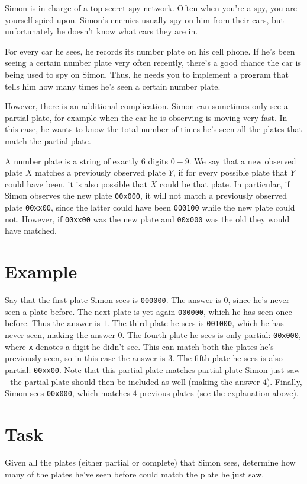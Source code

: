 \newcommand\version{v1}
Simon is in charge of a top secret spy network.
Often when you're a spy, you are yourself spied upon.
Simon's enemies usually spy on him from their cars, but unfortunately he doesn't know what cars they are in.

For every car he sees, he records its number plate on his cell phone.
If he's been seeing a certain number plate very often recently, there's a good chance the car is being used to spy on Simon.
Thus, he needs you to implement a program that tells him how many times he's seen a certain number plate.

However, there is an additional complication.
Simon can sometimes only see a partial plate, for example when the car he is observing is moving very fast.
In this case, he wants to know the total number of times he's seen all the plates that match the partial plate.

A number plate is a string of exactly 6 digits $0-9$. We say that a new observed plate $X$
matches a previously observed plate $Y$, if for every possible plate that $Y$ could have been, it is also
possible that $X$ could be that plate. In particular, if Simon observes the new plate \texttt{00x000}, it
will not match a previously observed plate \texttt{00xx00}, since the latter could have been \texttt{000100}
while the new plate could not. However, if \texttt{00xx00} was the new plate and \texttt{00x000} was the old
they would have matched.

\section*{Example}
Say that the first plate Simon sees is \texttt{000000}. The answer is $0$, since he's never seen a plate before.
The next plate is yet again \texttt{000000}, which he has seen once before. Thus the answer is $1$.
The third plate he sees is \texttt{001000}, which he has never seen, making the answer $0$.
The fourth plate he sees is only partial: \texttt{00x000}, where \texttt{x} denotes a digit he didn't see.
This can match both the plates he's previously seen, so in this case the answer is $3$.
The fifth plate he sees is also partial: \texttt{00xx00}.
Note that this partial plate matches partial plate Simon just saw - the partial plate should then be included as well (making the answer $4$).
Finally, Simon sees \texttt{00x000}, which matches $4$ previous plates (see the explanation above).

\section*{Task}
Given all the plates (either partial or complete) that Simon sees, determine how many of the
plates he've seen before could match the plate he just saw.

